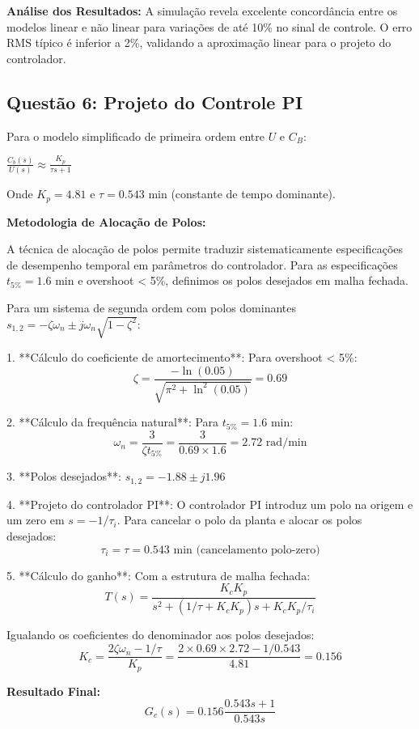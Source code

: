 \documentclass[a4paper,12pt]{article}
\begin{document}
\textbf{Análise dos Resultados:}
A simulação revela excelente concordância entre os modelos linear e não linear para variações de até 10\% no sinal de controle. O erro RMS típico é inferior a 2\%, validando a aproximação linear para o projeto do controlador.

\subsection{Questão 6: Projeto do Controle PI}

Para o modelo simplificado de primeira ordem entre $U$ e $C_B$:

$\frac{C_b(s)}{U(s)} \approx \frac{K_p}{\tau s + 1}$

Onde $K_p = 4.81$ e $\tau = 0.543$ min (constante de tempo dominante).

\textbf{Metodologia de Alocação de Polos:}

A técnica de alocação de polos permite traduzir sistematicamente especificações de desempenho temporal em parâmetros do controlador. Para as especificações $t_{5\%} = 1.6$ min e overshoot < 5\%, definimos os polos desejados em malha fechada.

Para um sistema de segunda ordem com polos dominantes $s_{1,2} = -\zeta\omega_n \pm j\omega_n\sqrt{1-\zeta^2}$:

1. **Cálculo do coeficiente de amortecimento**: Para overshoot < 5\%:
   $$\zeta = \frac{-\ln(0.05)}{\sqrt{\pi^2 + \ln^2(0.05)}} = 0.69$$

2. **Cálculo da frequência natural**: Para $t_{5\%} = 1.6$ min:
   $$\omega_n = \frac{3}{\zeta t_{5\%}} = \frac{3}{0.69 \times 1.6} = 2.72 \text{ rad/min}$$

3. **Polos desejados**: $s_{1,2} = -1.88 \pm j1.96$

4. **Projeto do controlador PI**: O controlador PI introduz um polo na origem e um zero em $s = -1/\tau_i$. Para cancelar o polo da planta e alocar os polos desejados:
   $$\tau_i = \tau = 0.543 \text{ min (cancelamento polo-zero)}$$

5. **Cálculo do ganho**: Com a estrutura de malha fechada:
   $$T(s) = \frac{K_c K_p}{s^2 + (1/\tau + K_c K_p)s + K_c K_p/\tau_i}$$
   
   Igualando os coeficientes do denominador aos polos desejados:
   $$K_c = \frac{2\zeta\omega_n - 1/\tau}{K_p} = \frac{2 \times 0.69 \times 2.72 - 1/0.543}{4.81} = 0.156$$

\textbf{Resultado Final:}
$$G_c(s) = 0.156 \frac{0.543s + 1}{0.543s}$$
\end{document}

